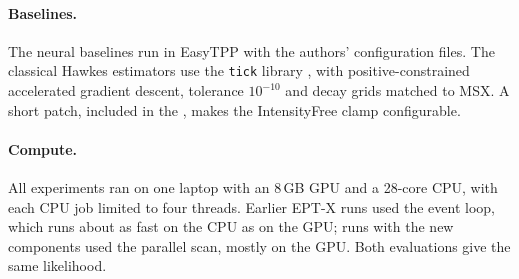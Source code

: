 \paragraph{Baselines.} The neural baselines run in EasyTPP with the authors' configuration files.
The classical Hawkes estimators use the \texttt{tick} library \citep{bacry2018tick}, with
positive-constrained accelerated gradient descent, tolerance $10^{-10}$ and decay grids matched to
MSX. A short patch, included in the \codename, makes the IntensityFree clamp
configurable.

\paragraph{Compute.} All experiments ran on one laptop with an 8\,GB GPU and a 28-core CPU, with
each CPU job limited to four threads. Earlier EPT-X runs used the event loop, which runs about as
fast on the CPU as on the GPU; runs with the new components used the parallel scan, mostly on the
GPU. Both evaluations give the same likelihood.
